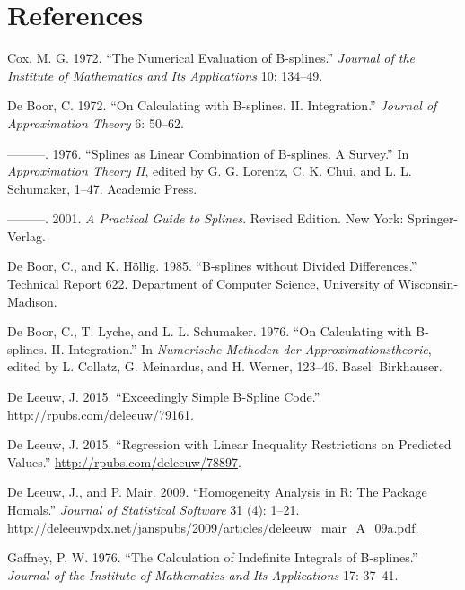 \documentclass[
  12pt,
]{article}
\newlength{\cslhangindent}
\newenvironment{cslreferences}%
  {\setlength{\parindent}{0pt}%
  \everypar{\setlength{\hangindent}{\cslhangindent}}\ignorespaces}%
  {\par}
\begin{document}
\hypertarget{references}{%
\section*{References}\label{references}}

\hypertarget{refs}{}
\begin{cslreferences}
\leavevmode\hypertarget{ref-cox_72}{}%
Cox, M. G. 1972. ``The Numerical Evaluation of B-splines.''
\emph{Journal of the Institute of Mathematics and Its Applications} 10:
134--49.

\leavevmode\hypertarget{ref-deboor_72}{}%
De Boor, C. 1972. ``On Calculating with B-splines. II. Integration.''
\emph{Journal of Approximation Theory} 6: 50--62.

\leavevmode\hypertarget{ref-deboor_76}{}%
---------. 1976. ``Splines as Linear Combination of B-splines. A
Survey.'' In \emph{Approximation Theory II}, edited by G. G. Lorentz, C.
K. Chui, and L. L. Schumaker, 1--47. Academic Press.

\leavevmode\hypertarget{ref-deboor_01}{}%
---------. 2001. \emph{A Practical Guide to Splines}. Revised Edition.
New York: Springer-Verlag.

\leavevmode\hypertarget{ref-deboor_hollig_85}{}%
De Boor, C., and K. Höllig. 1985. ``B-splines without Divided
Differences.'' Technical Report 622. Department of Computer Science,
University of Wisconsin-Madison.

\leavevmode\hypertarget{ref-deboor_lyche_schumaker_76}{}%
De Boor, C., T. Lyche, and L. L. Schumaker. 1976. ``On Calculating with
B-splines. II. Integration.'' In \emph{Numerische Methoden der
Approximationstheorie}, edited by L. Collatz, G. Meinardus, and H.
Werner, 123--46. Basel: Birkhauser.

\leavevmode\hypertarget{ref-deleeuw_E_15d}{}%
De Leeuw, J. 2015. ``Exceedingly Simple B-Spline Code.''
\url{http://rpubs.com/deleeuw/79161}.

\leavevmode\hypertarget{ref-deleeuw_E_15e}{}%
De Leeuw, J. 2015. ``Regression with Linear Inequality Restrictions on
Predicted Values.'' \url{http://rpubs.com/deleeuw/78897}.

\leavevmode\hypertarget{ref-deleeuw_mair_A_09a}{}%
De Leeuw, J., and P. Mair. 2009. ``Homogeneity Analysis in R: The
Package Homals.'' \emph{Journal of Statistical Software} 31 (4): 1--21.
\url{http://deleeuwpdx.net/janspubs/2009/articles/deleeuw_mair_A_09a.pdf}.

\leavevmode\hypertarget{ref-gaffney_76}{}%
Gaffney, P. W. 1976. ``The Calculation of Indefinite Integrals of
B-splines.'' \emph{Journal of the Institute of Mathematics and Its
Applications} 17: 37--41.


\end{cslreferences}
\end{document}
